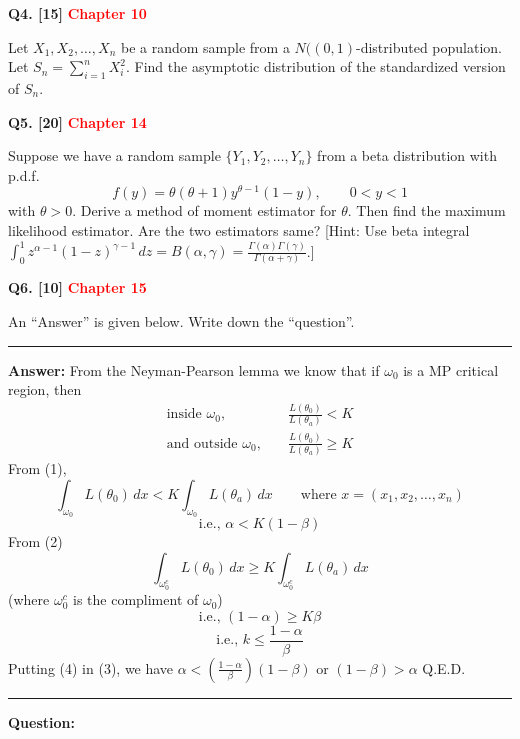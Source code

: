 \documentclass[11pt]{article}
\begin{document}
\bigskip
\textbf{Q4. [15]} \textbf{\textcolor{red}{Chapter 10}}

Let $X_1,X_2,\ldots,X_n$ be a random sample from a $N((0,1)$-distributed population. Let $S_n=\sum_{i=1}^n X_i^2$. Find the asymptotic distribution of the standardized version of $S_n$.

\bigskip
\textbf{Q5. [20]}  \textbf{\textcolor{red}{Chapter 14}}

Suppose we have a random sample $\{Y_1,Y_2,\ldots,Y_n\}$ from a beta distribution with p.d.f.
\[
f(y)=\theta(\theta+1)y^{\theta-1}(1-y),\qquad 0<y<1
\]
with $\theta>0$. Derive a method of moment estimator for $\theta$. Then find the maximum likelihood estimator. Are the two estimators same? [Hint: Use beta integral $\int_0^1 z^{\alpha-1}(1-z)^{\gamma-1}\,dz=B(\alpha,\gamma)=\frac{\Gamma(\alpha)\Gamma(\gamma)}{\Gamma(\alpha+\gamma)}$.]

\bigskip
\textbf{Q6. [10]}  \textbf{\textcolor{red}{Chapter 15}}

An ``Answer'' is given below. Write down the ``question''.

\medskip
\hrule
\medskip

\textbf{Answer:} From the Neyman-Pearson lemma we know that if $\omega_0$ is a MP critical region, then
\begin{align}
\text{inside }\omega_0,\quad &\frac{L(\theta_0)}{L(\theta_a)}<K \tag{1}\\
\text{and outside }\omega_0,\quad &\frac{L(\theta_0)}{L(\theta_a)}\geq K \tag{2}
\end{align}
From (1),
\[
\int_{\omega_0}L(\theta_0)\,dx<K\int_{\omega_0}L(\theta_a)\,dx
\qquad\text{where }x=(x_1,x_2,\ldots,x_n)
\]
\begin{equation}\tag{3}
\text{i.e., }\alpha<K(1-\beta)
\end{equation}
From (2)
\[
\int_{\omega_0^c}L(\theta_0)\,dx\geq K\int_{\omega_0^c}L(\theta_a)\,dx
\]
(where $\omega_0^c$ is the compliment of $\omega_0$)
\[
\text{i.e., }(1-\alpha)\geq K\beta
\]
\begin{equation}\tag{4}
\text{i.e., }k\leq\frac{1-\alpha}{\beta}
\end{equation}
Putting (4) in (3), we have $\alpha<\left(\frac{1-\alpha}{\beta}\right)(1-\beta)$ or $(1-\beta)>\alpha$ Q.E.D.

\medskip
\hrule
\medskip
\textbf{Question:}



\clearpage
\end{document}
